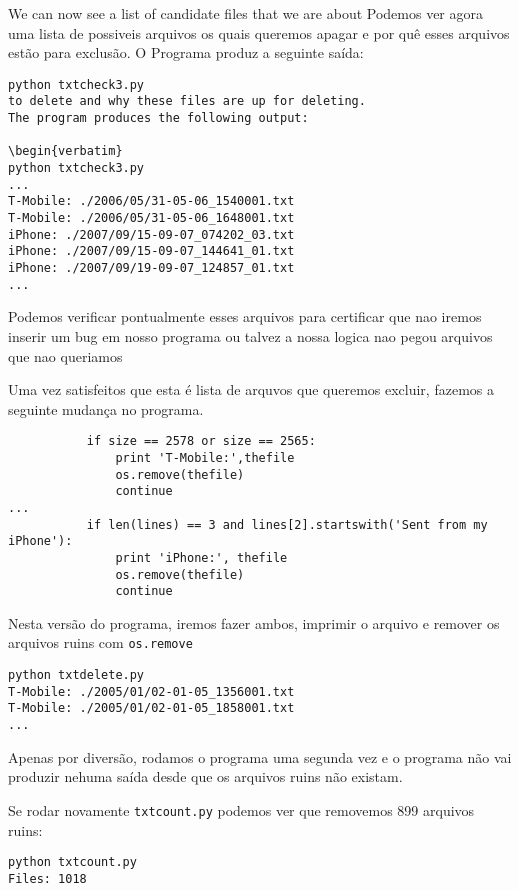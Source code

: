 We can now see a list of candidate files that we are about
Podemos ver agora uma lista de possiveis arquivos os quais queremos apagar e por quê esses arquivos estão
para exclusão.
O Programa produz a seguinte saída:

\begin{verbatim}
python txtcheck3.py
to delete and why these files are up for deleting.
The program produces the following output:

\begin{verbatim}
python txtcheck3.py
...
T-Mobile: ./2006/05/31-05-06_1540001.txt
T-Mobile: ./2006/05/31-05-06_1648001.txt
iPhone: ./2007/09/15-09-07_074202_03.txt
iPhone: ./2007/09/15-09-07_144641_01.txt
iPhone: ./2007/09/19-09-07_124857_01.txt
...
\end{verbatim}

%
Podemos verificar pontualmente esses arquivos para certificar que nao iremos inserir um bug em nosso programa
ou talvez a nossa logica nao pegou arquivos que nao queriamos

Uma vez satisfeitos que esta é lista de arquvos que queremos excluir, fazemos a seguinte mudança no programa.

\begin{verbatim}
           if size == 2578 or size == 2565:
               print 'T-Mobile:',thefile
               os.remove(thefile)
               continue
...
           if len(lines) == 3 and lines[2].startswith('Sent from my iPhone'):
               print 'iPhone:', thefile
               os.remove(thefile)
               continue
\end{verbatim}
%

Nesta versão do programa, iremos fazer ambos, imprimir o arquivo e remover os arquivos ruins com {\tt os.remove}

\begin{verbatim}
python txtdelete.py 
T-Mobile: ./2005/01/02-01-05_1356001.txt
T-Mobile: ./2005/01/02-01-05_1858001.txt
...
\end{verbatim}
%
Apenas por diversão, rodamos o programa uma segunda vez e o programa não vai produzir nehuma saída desde que os arquivos ruins
não existam.


Se rodar novamente {\tt txtcount.py} podemos ver que removemos 899 arquivos ruins:

\begin{verbatim}
python txtcount.py 
Files: 1018
\end{verbatim}

%

